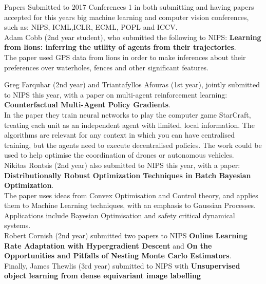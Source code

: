 \documentclass[10pt,final]{papertex}
\begin{document}
\newssep

\begin{news}{1}
	{Papers Submitted to 2017 Conferences}
	{}
	{}
	{1}
\noindent in both submitting and having papers accepted for this years big machine learning and computer vision conferences, such as: NIPS, ICML,ICLR, ECML, POPL and ICCV.\\

Adam Cobb (2nd year student), who submitted the following to NIPS:\hspace{0.1mm} \textbf{Learning from  lions: inferring the utility of agents from their trajectories}.\\
 The paper used GPS data from lions in order to make inferences about their preferences over waterholes, fences and other significant features.

\noindent Greg Farquhar (2nd year) and Triantafyllos Afouras (1st year), jointly submitted to NIPS this year, with a paper on multi-agent reinforcement learning:\hspace{0.1mm}\textbf{ Counterfactual Multi-Agent Policy Gradients}.\\
In the paper they train neural networks to play the computer game StarCraft, treating each unit as an independent agent with limited, local information. The algorithms are relevant for any context in which you can have centralised training, but the agents need to execute decentralised policies. The work could be used to help optimise the coordination of drones or autonomous vehicles.\\
Nikitas Rontsis (2nd year) also submitted to NIPS this year, with a paper: \textbf{Distributionally Robust Optimization Techniques in Batch Bayesian Optimization}.\\
 The paper  uses ideas from Convex Optimisation and Control theory, and applies them to Machine Learning techniques, with an emphasis to Gaussian Processes. Applications include Bayesian Optimisation and safety critical dynamical systems.\\
 Robert Cornish (2nd year) submitted two papers to NIPS \textbf{Online Learning Rate Adaptation with Hypergradient Descent } and \textbf{On the Opportunities and Pitfalls of Nesting Monte Carlo Estimators}.\\
 Finally, James Thewlis (3rd year) submitted to NIPS with \textbf{ Unsupervised object learning from dense equivariant image labelling}\\
 

\end{news}
\end{document}
